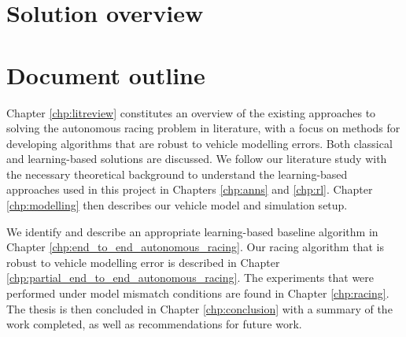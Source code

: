 \section{Solution overview}\label{sec:Solution_overview}



\section{Document outline}
\label{sec:outline}

Chapter \ref{chp:litreview} constitutes an overview of the existing approaches to solving the autonomous racing problem in literature, with a focus on methods for developing algorithms that are robust to vehicle modelling errors. Both classical and learning-based solutions are discussed.
We follow our literature study with the necessary theoretical background to understand the learning-based approaches used in this project in Chapters \ref{chp:anns} and \ref{chp:rl}.
Chapter \ref{chp:modelling} then describes our vehicle model and simulation setup.

We identify and describe an appropriate learning-based baseline algorithm in Chapter \ref{chp:end_to_end_autonomous_racing}.
Our racing algorithm that is robust to vehicle modelling error is described in Chapter \ref{chp:partial_end_to_end_autonomous_racing}.
The experiments that were performed under model mismatch conditions are found in Chapter \ref{chp:racing}.
The thesis is then concluded in Chapter \ref{chp:conclusion} with a summary of the work completed, as well as recommendations for future work.
